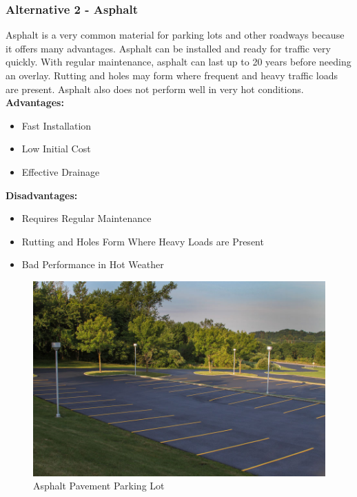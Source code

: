 \documentclass{ceri}
\begin{document}
\subsubsection{Alternative 2 - Asphalt}
Asphalt is a very common material for parking lots and other roadways because it offers many advantages. Asphalt can be installed and ready for traffic very quickly. With regular maintenance, asphalt can last up to 20 years before needing an overlay. Rutting and holes may form where frequent and heavy traffic loads are present. Asphalt also does not perform well in very hot conditions.
\textbf{Advantages:}
\begin{itemize}
    \item Fast Installation
    \item Low Initial Cost
    \item Effective Drainage
\end{itemize}
\textbf{Disadvantages:}
\begin{itemize}
    \item Requires Regular Maintenance
    \item Rutting and Holes Form Where Heavy Loads are Present
    \item Bad Performance in Hot Weather
\end{itemize}

\begin{figure}[H]
    \centering
    \includegraphics[width=.7\textwidth]{images/Pavement2.png}
    \caption{Asphalt Pavement Parking Lot}
    \label{fig:P_SAPPL}
\end{figure}
\end{document}
